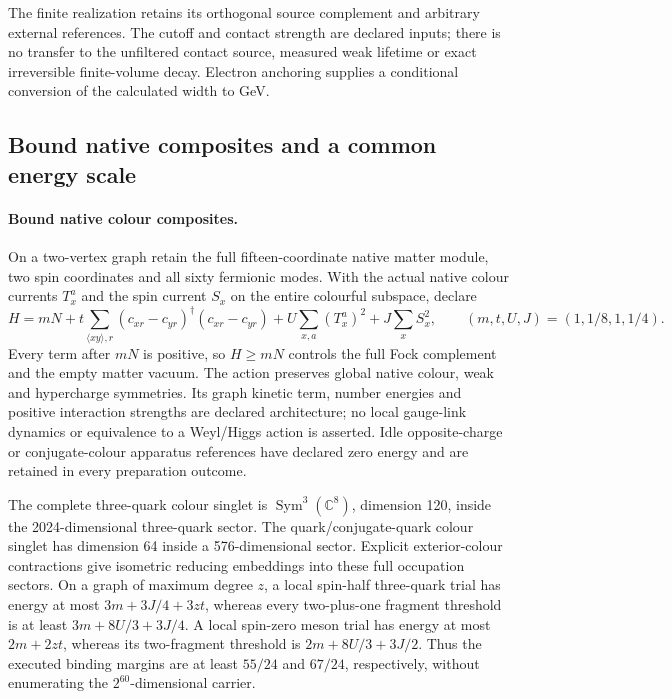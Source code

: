 The finite realization retains its orthogonal source complement and arbitrary
external references. The cutoff and contact strength are declared inputs;
there is no transfer to the unfiltered contact source, measured weak lifetime
or exact irreversible finite-volume decay. Electron anchoring supplies a
conditional conversion of the calculated width to GeV.


\subsection{Bound native composites and a common energy scale}


\paragraph{Bound native colour composites.}
On a two-vertex graph retain the full fifteen-coordinate native matter module,
two spin coordinates and all sixty fermionic modes. With the actual native
colour currents $T_x^a$ and the spin current $S_x$ on the entire colourful
subspace, declare
\[
 H=mN+t\sum_{\langle xy\rangle,r}(c_{xr}-c_{yr})^\dagger(c_{xr}-c_{yr})
      +U\sum_{x,a}(T_x^a)^2+J\sum_x S_x^2,
 \qquad (m,t,U,J)=(1,1/8,1,1/4).
\]
Every term after $mN$ is positive, so $H\geq mN$ controls the full Fock
complement and the empty matter vacuum. The action preserves global native
colour, weak and hypercharge symmetries. Its graph kinetic term, number
energies and positive interaction strengths are declared architecture;
no local gauge-link dynamics or equivalence to a Weyl/Higgs action is asserted.
Idle opposite-charge or conjugate-colour apparatus references have declared
zero energy and are retained in every preparation outcome.

The complete three-quark colour singlet is
$\operatorname{Sym}^3(\mathbb C^8)$, dimension 120, inside the 2024-dimensional
three-quark sector. The quark/conjugate-quark colour singlet has dimension 64
inside a 576-dimensional sector. Explicit exterior-colour contractions give
isometric reducing embeddings into these full occupation sectors. On a graph
of maximum degree $z$, a local spin-half three-quark trial has energy at most
$3m+3J/4+3zt$, whereas every two-plus-one fragment threshold is at least
$3m+8U/3+3J/4$. A local spin-zero meson trial has energy at most $2m+2zt$,
whereas its two-fragment threshold is $2m+8U/3+3J/2$. Thus the executed
binding margins are at least $55/24$ and $67/24$, respectively, without
enumerating the $2^{60}$-dimensional carrier.

